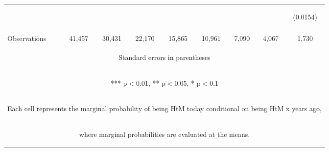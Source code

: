 \begin{center}
\begin{tabular}{lcccccccc}
 & \begin{footnotesize}\end{footnotesize} & \begin{footnotesize}\end{footnotesize} & \begin{footnotesize}\end{footnotesize} & \begin{footnotesize}\end{footnotesize} & \begin{footnotesize}\end{footnotesize} & \begin{footnotesize}\end{footnotesize} & \begin{footnotesize}\end{footnotesize} & \begin{footnotesize}(0.0154)\end{footnotesize} \\
\vspace{4pt} & \begin{footnotesize}\end{footnotesize} & \begin{footnotesize}\end{footnotesize} & \begin{footnotesize}\end{footnotesize} & \begin{footnotesize}\end{footnotesize} & \begin{footnotesize}\end{footnotesize} & \begin{footnotesize}\end{footnotesize} & \begin{footnotesize}\end{footnotesize} & \begin{footnotesize}\end{footnotesize} \\
 Observations & 41,457 & 30,431 & 22,170 & 15,865 & 10,961 & 7,090 & 4,067 & 1,730 \\ \hline
\multicolumn{9}{c}{\begin{footnotesize} Standard errors in parentheses\end{footnotesize}} \\
\multicolumn{9}{c}{\begin{footnotesize} *** p$<$0.01, ** p$<$0.05, * p$<$0.1\end{footnotesize}} \\
\multicolumn{9}{c}{\begin{footnotesize} Each cell represents the marginal probability of being HtM today conditional on being HtM x years ago,\end{footnotesize}} \\
\multicolumn{9}{c}{\begin{footnotesize} where marginal probabilities are evaluated at the means.\end{footnotesize}} \\
\end{tabular}
\end{center}
